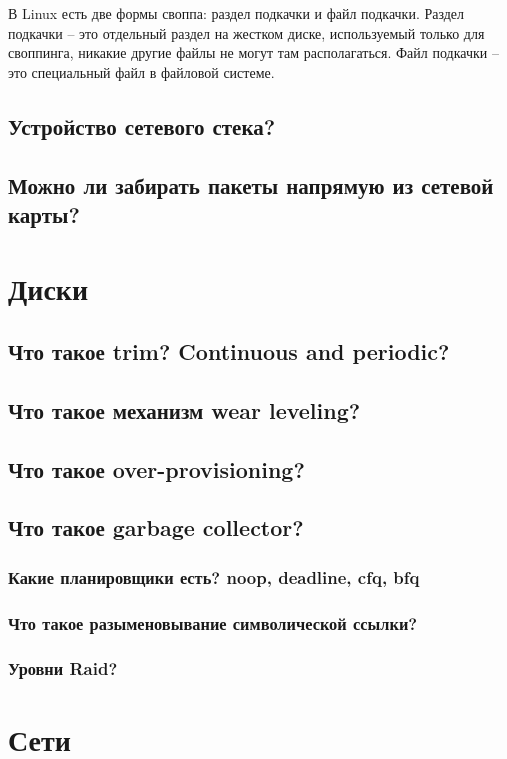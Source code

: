 В Linux есть две формы своппа: раздел подкачки и файл подкачки. Раздел подкачки – это отдельный раздел на жестком диске, используемый только для своппинга, никакие другие файлы не могут там располагаться. Файл подкачки – это специальный файл в файловой системе.

\section{Устройство сетевого стека?}

\section{Можно ли забирать пакеты напрямую из сетевой карты?}

\chapter{Диски}

\section{Что такое trim? Continuous and periodic?}
\section{Что такое механизм wear leveling?} 
\section{Что такое over-provisioning?}
\section{Что такое garbage collector?}
\subsection{Какие планировщики есть? noop, deadline, cfq, bfq}
\subsection{Что такое разыменовывание символической ссылки?}
\subsection{Уровни Raid?}

\chapter{Сети}

